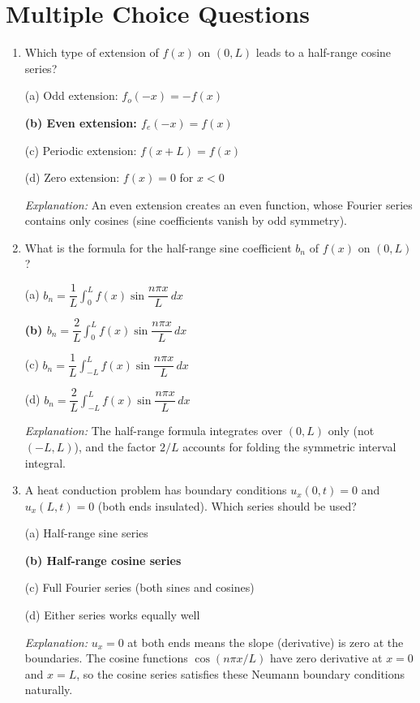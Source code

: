 \documentclass[12pt,a4paper]{article}
\begin{document}
\section{Multiple Choice Questions}

\begin{enumerate}[leftmargin=*, label=\textbf{Q\arabic*.}]

\item Which type of extension of $f(x)$ on $(0,L)$ leads to a half-range cosine series?

(a) Odd extension: $f_o(-x) = -f(x)$

\textbf{(b) Even extension: $f_e(-x) = f(x)$}

(c) Periodic extension: $f(x+L) = f(x)$

(d) Zero extension: $f(x) = 0$ for $x < 0$

\textit{Explanation:} An even extension creates an even function, whose Fourier series contains only cosines (sine coefficients vanish by odd symmetry).

\item What is the formula for the half-range sine coefficient $b_n$ of $f(x)$ on $(0,L)$?

(a) $b_n = \dfrac{1}{L}\displaystyle\int_0^L f(x)\sin\dfrac{n\pi x}{L}\,dx$

\textbf{(b) $b_n = \dfrac{2}{L}\displaystyle\int_0^L f(x)\sin\dfrac{n\pi x}{L}\,dx$}

(c) $b_n = \dfrac{1}{L}\displaystyle\int_{-L}^L f(x)\sin\dfrac{n\pi x}{L}\,dx$

(d) $b_n = \dfrac{2}{L}\displaystyle\int_{-L}^L f(x)\sin\dfrac{n\pi x}{L}\,dx$

\textit{Explanation:} The half-range formula integrates over $(0,L)$ only (not $(-L,L)$), and the factor $2/L$ accounts for folding the symmetric interval integral.

\item A heat conduction problem has boundary conditions $u_x(0,t)=0$ and $u_x(L,t)=0$ (both ends insulated). Which series should be used?

(a) Half-range sine series

\textbf{(b) Half-range cosine series}

(c) Full Fourier series (both sines and cosines)

(d) Either series works equally well

\textit{Explanation:} $u_x=0$ at both ends means the slope (derivative) is zero at the boundaries. The cosine functions $\cos(n\pi x/L)$ have zero derivative at $x=0$ and $x=L$, so the cosine series satisfies these Neumann boundary conditions naturally.


\end{enumerate}
\end{document}
